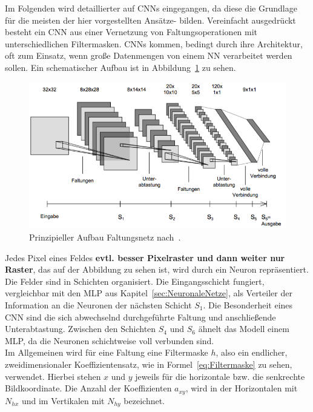 \documentclass[times, 11pt,twocolumn]{article}
\begin{document}
 \label{sec:Faltungsnetze}
Im Folgenden wird detaillierter auf CNNs eingegangen, da diese die Grundlage für die meisten der hier vorgestellten Ansätze- bilden. Vereinfacht ausgedrückt besteht ein CNN aus einer Vernetzung von Faltungsoperationen mit unterschiedlichen Filtermasken. CNNs kommen, bedingt durch ihre Architektur, oft zum Einsatz, wenn große Datenmengen von einem NN verarbeitet werden sollen. Ein schematischer Aufbau ist in Abbildung~\ref{fig:CNN} zu sehen. \\
\begin{figure}
	\flushleft
	\includegraphics[width=\columnwidth]{Bilder/structure-cnn.jpg}
	\caption{Prinzipieller Aufbau Faltungsnetz nach~\cite{Osadchy}.}
	\label{fig:CNN}
\end{figure}
Jedes Pixel eines Feldes \textbf{evtl. besser Pixelraster und dann weiter nur Raster}, das auf der Abbildung zu sehen ist, wird durch ein Neuron repräsentiert. Die Felder sind in Schichten organisiert. Die Eingangsschicht fungiert, vergleichbar mit den MLP aus Kapitel~\ref{sec:NeuronaleNetze}, als Verteiler der Information an die Neuronen der nächsten Schicht $S_1$. Die Besonderheit eines CNN sind die sich abwechselnd durchgeführte Faltung und anschließende Unterabtastung. Zwischen den Schichten $S_4$ und $S_6$ ähnelt das Modell einem MLP, da die Neuronen schichtweise voll verbunden sind.\\
Im Allgemeinen wird für eine Faltung eine Filtermaske $h$, also ein endlicher, zweidimensionaler Koeffizientensatz, wie in Formel~\ref{eq:Filtermaske} zu sehen, verwendet. Hierbei stehen $x$ und $y$ jeweils für die horizontale bzw. die senkrechte Bildkoordinate. Die Anzahl der Koeffizienten $a_{xy}$, wird in der Horizontalen mit $N_{hx}$ und im Vertikalen mit $N_{hy}$ bezeichnet.
\footnotesize
\end{document}
